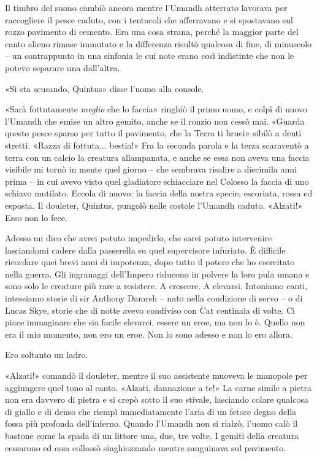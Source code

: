 Il timbro del suono cambiò ancora mentre l'Umandh atterrato lavorava per
raccogliere il pesce caduto, con i tentacoli che afferravano e si
spostavano sul rozzo pavimento di cemento. Era una cosa strana, perché
la maggior parte del canto alieno rimase immutato e la differenza
risultò qualcosa di fine, di minuscolo -- un contrappunto in una
sinfonia le cui note erano così indistinte che non le potevo separare
una dall'altra.

«Si sta scusando, Quintus» disse l'uomo alla console.

«Sarà fottutamente \emph{meglio} che lo faccia» ringhiò il primo uomo, e
colpì di nuovo l'Umandh che emise un altro gemito, anche se il ronzio
non cessò mai. «Guarda questo pesce sparso per tutto il pavimento, che
la Terra ti bruci» sibilò a denti stretti. «Razza di fottuta... bestia!»
Fra la seconda parola e la terza scaraventò a terra con un calcio la
creatura allampanata, e anche se essa non aveva una faccia visibile mi
tornò in mente quel giorno -- che sembrava risalire a diecimila anni
prima -- in cui avevo visto quel gladiatore schiacciare nel Colosso la
faccia di uno schiavo mutilato. Eccola di nuovo: la faccia della nostra
specie, escoriata, rossa ed esposta. Il douleter, Quintus, pungolò nelle
costole l'Umandh caduto. «Alzati!» Esso non lo fece.

Adesso mi dico che avrei potuto impedirlo, che sarei potuto intervenire
lasciandomi cadere dalla passerella su quel supervisore infuriato. È
difficile ricordare quei brevi anni di impotenza, dopo tutto il potere
che ho esercitato nella guerra. Gli ingranaggi dell'Impero riducono in
polvere la loro pula umana e sono solo le creature più rare a resistere.
A crescere. A elevarsi. Intoniamo canti, intessiamo storie di sir
Anthony Damrsh -- nato nella condizione di servo -- o di Lucas Skye,
storie che di notte avevo condiviso con Cat centinaia di volte. Ci piace
immaginare che sia facile elevarci, essere un eroe, ma non lo è. Quello
non era il mio momento, non ero un eroe. Non lo sono adesso e non lo ero
allora.

Ero soltanto un ladro.

«Alzati!» comandò il douleter, mentre il suo assistente muoveva le
manopole per aggiungere quel tono al canto. «Alzati, dannazione a te!»
La carne simile a pietra non era davvero di pietra e si crepò sotto il
suo stivale, lasciando colare qualcosa di giallo e di denso che riempì
immediatamente l'aria di un fetore degno della fossa più profonda
dell'inferno. Quando l'Umandh non si rialzò, l'uomo calò il bastone come
la spada di un littore una, due, tre volte. I gemiti della creatura
cessarono ed essa collassò singhiozzando mentre sanguinava sul
pavimento.

